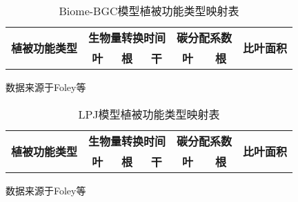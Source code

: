 \begin{enumerate}[(1)]
    \begin{table}
        \centering
        \caption{Biome-BGC模型植被功能类型映射表}
        \label{tab:Biome-BGC-PFT-map}
        \begin{threeparttable}
            \begin{tabular}{lcccccc}
                \toprule 
                \multirow{2}{*}{\textbf{植被功能类型}} & \multicolumn{3}{c}{\textbf{生物量转换时间}} & \multicolumn{2}{c}{\textbf{碳分配系数}} & \multirow{2}{*}{\textbf{比叶面积}} \\ 
                \cmidrule(lr){2-4} \cmidrule(lr){5-6}
                & \textbf{叶} & \textbf{根} & \textbf{干} & \textbf{叶} & \textbf{根} &  \\ 
                \midrule
                \bottomrule
            \end{tabular}
            \begin{tablenotes}
                \footnotesize
                \item[]数据来源于Foley等~\cite{foley1996integrated}
            \end{tablenotes}
        \end{threeparttable}
    \end{table}

    \begin{table}
        \centering
        \caption{LPJ模型植被功能类型映射表}
        \label{tab:LPJ-PFT-map}
        \begin{threeparttable}
            \begin{tabular}{lcccccc}
                \toprule 
                \multirow{2}{*}{\textbf{植被功能类型}} & \multicolumn{3}{c}{\textbf{生物量转换时间}} & \multicolumn{2}{c}{\textbf{碳分配系数}} & \multirow{2}{*}{\textbf{比叶面积}} \\ 
                \cmidrule(lr){2-4} \cmidrule(lr){5-6}
                & \textbf{叶} & \textbf{根} & \textbf{干} & \textbf{叶} & \textbf{根} &  \\ 
                \midrule
                \bottomrule
            \end{tabular}
            \begin{tablenotes}
                \footnotesize
                \item[]数据来源于Foley等~\cite{foley1996integrated}
            \end{tablenotes}
        \end{threeparttable}
    \end{table}


\end{enumerate}
